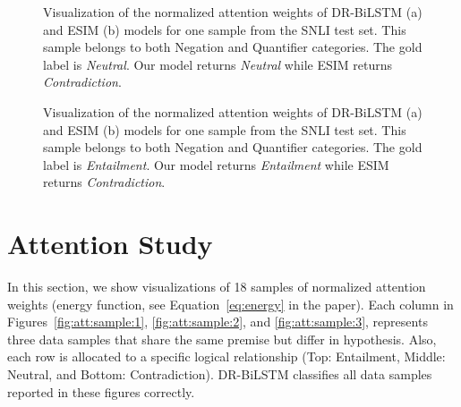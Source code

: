 \documentclass[11pt,a4paper]{article}
\begin{document}
	
	\begin{figure*}[ht]
		\begin{center}
\end{center}
		\caption{
			Visualization of the normalized attention weights of DR-BiLSTM (a) and ESIM (b) models for one sample from the SNLI test set. This sample belongs to both Negation and Quantifier categories. The gold label is \emph{Neutral}. Our model returns \emph{Neutral} while ESIM returns \emph{Contradiction}.
		}
		\label{fig:att:ana:cat3}
	\end{figure*}
	
	
	\begin{figure*}[ht]
		\begin{center}
\end{center}
		\caption{
			Visualization of the normalized attention weights of DR-BiLSTM (a) and ESIM (b) models for one sample from the SNLI test set. This sample belongs to both Negation and Quantifier categories. The gold label is \emph{Entailment}. Our model returns \emph{Entailment} while ESIM returns \emph{Contradiction}.
		}
		\label{fig:att:ana:cat4}
	\end{figure*}
	
	\section{Attention Study}
	\label{app:att:sec}
	
	In this section, we show visualizations of 18 samples of normalized attention weights (energy function, see Equation~\ref{eq:energy} in the paper). Each column in Figures~\ref{fig:att:sample:1}, \ref{fig:att:sample:2}, and \ref{fig:att:sample:3}, represents three data samples that share the same premise but differ in hypothesis. Also, each row is allocated to a specific logical relationship (Top: Entailment, Middle: Neutral, and Bottom: Contradiction). DR-BiLSTM classifies all data samples reported in these figures correctly.
	
\end{document}
